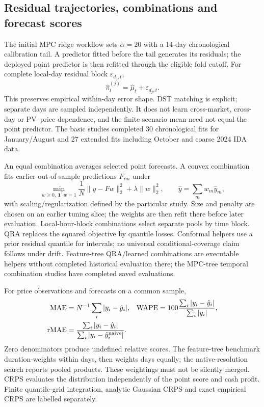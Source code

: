 \subsection{Residual trajectories, combinations and forecast scores}
The initial MPC ridge workflow sets $\alpha=20$ with a 14-day chronological
calibration tail. A predictor fitted before the tail generates its residuals;
the deployed point predictor is then refitted through the eligible fold cutoff.
For complete local-day residual block $\varepsilon_{d_j,t}$,
\begin{equation}
 \hat\pi^{(j)}_t=\hat\mu_t+\varepsilon_{d_j,t}.
\end{equation}
This preserves empirical within-day error shape. DST matching is explicit;
separate days are sampled independently. It does not learn cross-market,
cross-day or PV--price dependence, and the finite scenario mean need not equal
the point predictor. The basic studies completed 30 chronological fits for
January/August and 27 extended fits including October and coarse 2024 IDA data.

An equal combination averages selected point forecasts. A convex combination
fits earlier out-of-sample predictions $F_{im}$ under
\begin{equation}
 \min_{w\ge0,\ \mathbf1^{\mathsf T}w=1}
 \frac1N\|y-Fw\|_2^2+\lambda\|w\|_2^2,
 \qquad \hat y=\sum_mw_m\hat y_m,
\end{equation}
with scaling/regularization defined by the particular study. Size and penalty
are chosen on an earlier tuning slice; the weights are then refit there before
later evaluation. Local-hour-block combinations select separate pools by time
block. QRA replaces the squared objective by quantile losses. Conformal helpers
use a prior residual quantile for intervals; no universal conditional-coverage
claim follows under drift. Feature-tree QRA/learned combinations are executable
helpers without completed historical evaluation there; the MPC-tree temporal
combination studies have completed saved evaluations.

For price observations and forecasts on a common sample,
\begin{align}
 \mathrm{MAE}&=N^{-1}\sum_i|y_i-\hat y_i|,&
 \mathrm{WAPE}&=100\frac{\sum_i|y_i-\hat y_i|}{\sum_i|y_i|},\\
 \mathrm{rMAE}&=\frac{\sum_i|y_i-\hat y_i|}{\sum_i|y_i-\hat y_i^{\rm naive}|}.
\end{align}
Zero denominators produce undefined relative scores. The feature-tree benchmark
duration-weights within days, then weights days equally; the native-resolution
search reports pooled products. These weightings must not be silently merged.
CRPS evaluates the distribution independently of the point score and cash profit.
Finite quantile-grid integration, analytic Gaussian CRPS and exact empirical
CRPS are labelled separately.

